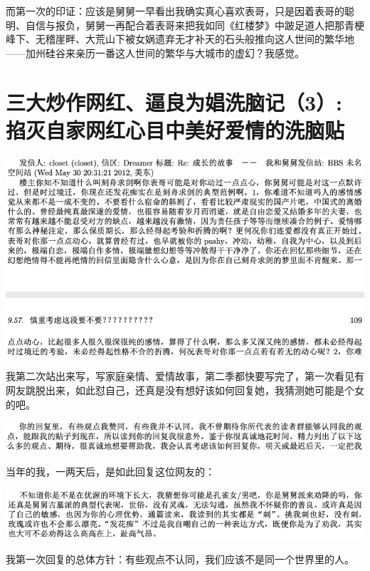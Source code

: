 \documentclass[9pt, b5paper]{article}
\begin{document}
而第一次的印证：应该是舅舅一早看出我确实真心喜欢表哥，只是因着表哥的聪明、自信与报负，舅舅一再配合着表哥来把我如同《红楼梦》中跛足道人把那青梗峰下、无稽崖畔、大荒山下被女娲遗弃无才补天的石头般推向这人世间的繁华地——加州硅谷来亲历一番这人世间的繁华与大城市的虚幻？我感觉。

\section{三大炒作网红、逼良为娼洗脑记（3）: 掐灭自家网红心目中美好爱情的洗脑贴}
\label{sec:orgb848cb4}

\begin{center}
\includegraphics[width=.9\linewidth]{./pic/p1p108-3.png}
\end{center}

我第二次站出来写，写家庭亲情、爱情故事，第二季都快要写完了，第一次看见有网友跳脱出来，如此怼自己，还真是没有想好该如何回复她，我猜测她可能是个女的吧。 

\begin{center}
\includegraphics[width=.9\linewidth]{./pic/p1p114.png}
\end{center}

当年的我，一两天后，是如此回复这位网友的：

\begin{center}
\includegraphics[width=.9\linewidth]{./pic/p1p114-1.png}
\end{center}

我第一次回复的总体方针：有些观点不认同，我们应该不是同一个世界里的人。
\end{document}
